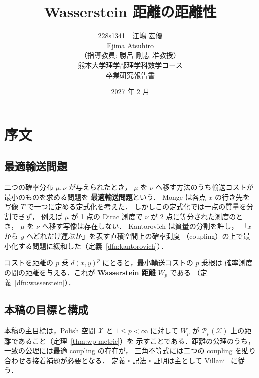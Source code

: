 \documentclass[12pt,a4j,twoside]{jreport}
\numberwithin{equation}{chapter}
\theoremstyle{definition} %
\newcommand{\X}{\mathcal{X}}
\newcommand{\Pp}[1]{\mathcal{P}_{#1}}
\newcommand{\Wass}{W}
\begin{document}
\title{ %
\huge Wasserstein 距離の距離性 \\[5cm] %
}
\author{228s1341　江嶋 宏優 \\
\qquad\qquad\quad Ejima Atsuhiro\\[1cm]
（指導教員: 勝呂 剛志 准教授） \\[1cm]
熊本大学理学部理学科数学コース \\
卒業研究報告書}
\date{\Large 2027 年 2 月} %
\maketitle %
\thispagestyle{empty}
\clearpage
\tableofcontents %
\thispagestyle{empty}
\newpage
\setcounter{page}{1}
\renewcommand{\thepage}{\arabic{page}}


\chapter{序文}

\section{最適輸送問題}

二つの確率分布 $\mu,\nu$ が与えられたとき，
$\mu$ を $\nu$ へ移す方法のうち輸送コストが最小のものを求める問題を
\textbf{最適輸送問題}という．
Monge は各点 $x$ の行き先を写像 $T$ で一つに定める定式化を考えた．
しかしこの定式化では一点の質量を分割できず，
例えば $\mu$ が 1 点の Dirac 測度で $\nu$ が 2 点に等分された測度のとき，
$\mu$ を $\nu$ へ移す写像は存在しない．
Kantorovich は質量の分割を許し，
「$x$ から $y$ へどれだけ運ぶか」を表す直積空間上の確率測度
（coupling）の上で最小化する問題に緩和した（定義~\ref{dfn:kantorovich}）．

コストを距離の $p$ 乗 $d(x,y)^p$ にとると，最小輸送コストの $p$ 乗根は
確率測度の間の距離を与える．これが \textbf{Wasserstein 距離} $\Wass_p$ である
（定義~\ref{dfn:wasserstein}）．

\section{本稿の目標と構成}

本稿の主目標は，Polish 空間 $\X$ と $1\leq p<\infty$ に対して
$\Wass_p$ が $\Pp{p}(\X)$ 上の距離であること（定理~\ref{thm:wp-metric}）を
示すことである．距離の公理のうち，一致の公理には最適 coupling の存在が，
三角不等式には二つの coupling を貼り合わせる接着補題が必要となる．
定義・記法・証明は主として Villani~\cite{Villani} に従う．
\end{document}
